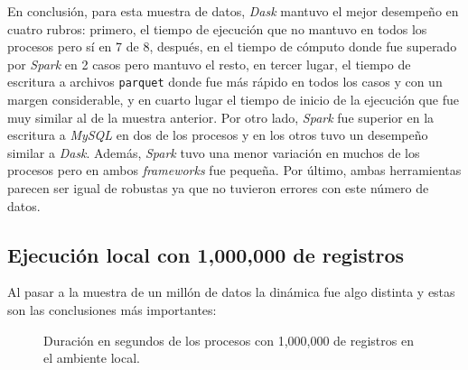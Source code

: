 En conclusión, para esta muestra de datos, \textit{Dask} mantuvo el mejor desempeño en cuatro rubros: primero, el tiempo de ejecución que no mantuvo en todos los procesos pero sí en 7 de 8, después, en el tiempo de cómputo donde fue superado por \textit{Spark} en 2 casos pero mantuvo el resto, en tercer lugar, el tiempo de escritura a archivos \texttt{parquet} donde fue más rápido en todos los casos y con un margen considerable, y en cuarto lugar el tiempo de inicio de la ejecución que fue muy similar al de la muestra anterior. Por otro lado, \textit{Spark} fue superior en la escritura a \textit{MySQL} en dos de los procesos y en los otros tuvo un desempeño similar a \textit{Dask}. Además, \textit{Spark} tuvo una menor variación en muchos de los procesos pero en ambos \textit{frameworks} fue pequeña. Por último, ambas herramientas parecen ser igual de robustas ya que no tuvieron errores con este número de datos. 


\subsection{Ejecución local con 1,000,000 de registros}

Al pasar a la muestra de un millón de datos la dinámica fue algo distinta y estas son las conclusiones más importantes:

\begin{center}
\begin{figure}
\caption{Duración en segundos de los procesos con 1,000,000 de registros en el ambiente local.}
\label{barras:duracion1M}
\end{figure}
\end{center}

